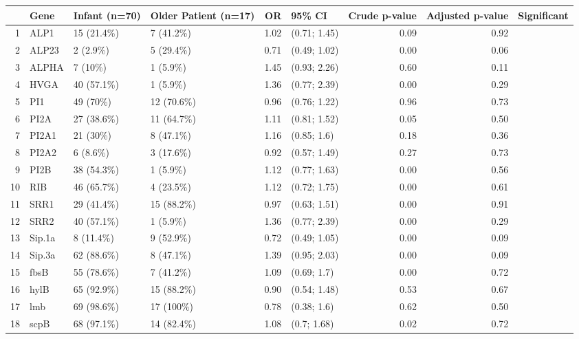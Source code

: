 \begin{table}[ht]
\centering
\begin{tabular}{rlllrlrrl}
  \hline
 & Gene & Infant (n=70) & Older Patient (n=17) & OR & 95\% CI & Crude p-value & Adjusted p-value & Significant \\ 
  \hline
1 & ALP1 & 15 (21.4\%) & 7 (41.2\%) & 1.02 & (0.71; 1.45) & 0.09 & 0.92 &  \\ 
  2 & ALP23 & 2 (2.9\%) & 5 (29.4\%) & 0.71 & (0.49; 1.02) & 0.00 & 0.06 &  \\ 
  3 & ALPHA & 7 (10\%) & 1 (5.9\%) & 1.45 & (0.93; 2.26) & 0.60 & 0.11 &  \\ 
  4 & HVGA & 40 (57.1\%) & 1 (5.9\%) & 1.36 & (0.77; 2.39) & 0.00 & 0.29 &  \\ 
  5 & PI1 & 49 (70\%) & 12 (70.6\%) & 0.96 & (0.76; 1.22) & 0.96 & 0.73 &  \\ 
  6 & PI2A & 27 (38.6\%) & 11 (64.7\%) & 1.11 & (0.81; 1.52) & 0.05 & 0.50 &  \\ 
  7 & PI2A1 & 21 (30\%) & 8 (47.1\%) & 1.16 & (0.85; 1.6) & 0.18 & 0.36 &  \\ 
  8 & PI2A2 & 6 (8.6\%) & 3 (17.6\%) & 0.92 & (0.57; 1.49) & 0.27 & 0.73 &  \\ 
  9 & PI2B & 38 (54.3\%) & 1 (5.9\%) & 1.12 & (0.77; 1.63) & 0.00 & 0.56 &  \\ 
  10 & RIB & 46 (65.7\%) & 4 (23.5\%) & 1.12 & (0.72; 1.75) & 0.00 & 0.61 &  \\ 
  11 & SRR1 & 29 (41.4\%) & 15 (88.2\%) & 0.97 & (0.63; 1.51) & 0.00 & 0.91 &  \\ 
  12 & SRR2 & 40 (57.1\%) & 1 (5.9\%) & 1.36 & (0.77; 2.39) & 0.00 & 0.29 &  \\ 
  13 & Sip.1a & 8 (11.4\%) & 9 (52.9\%) & 0.72 & (0.49; 1.05) & 0.00 & 0.09 &  \\ 
  14 & Sip.3a & 62 (88.6\%) & 8 (47.1\%) & 1.39 & (0.95; 2.03) & 0.00 & 0.09 &  \\ 
  15 & fbsB & 55 (78.6\%) & 7 (41.2\%) & 1.09 & (0.69; 1.7) & 0.00 & 0.72 &  \\ 
  16 & hylB & 65 (92.9\%) & 15 (88.2\%) & 0.90 & (0.54; 1.48) & 0.53 & 0.67 &  \\ 
  17 & lmb & 69 (98.6\%) & 17 (100\%) & 0.78 & (0.38; 1.6) & 0.62 & 0.50 &  \\ 
  18 & scpB & 68 (97.1\%) & 14 (82.4\%) & 1.08 & (0.7; 1.68) & 0.02 & 0.72 &  \\ 
   \hline
\end{tabular}
\end{table}

